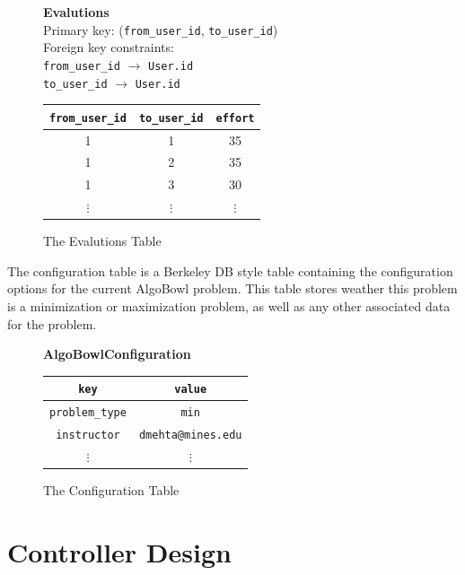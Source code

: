 \documentclass[12pt]{article}
\begin{document}
\begin{figure}
    \centering
    \textbf{Evalutions} \\
    Primary key: (\texttt{from\_user\_id}, \texttt{to\_user\_id}) \\
    Foreign key constraints: \\
    \texttt{from\_user\_id} $\to$ \texttt{User.id} \\
    \texttt{to\_user\_id} $\to$ \texttt{User.id} \\
    \begin{tabular}{| c | c | c |}
        \hline
        \texttt{from\_user\_id} & \texttt{to\_user\_id} & \texttt{effort} \\
        \hline
        1 & 1 & 35 \\
        \hline
        1 & 2 & 35 \\
        \hline
        1 & 3 & 30 \\
        \hline
        $\vdots$ & $\vdots$ & $\vdots$ \\
        \hline
    \end{tabular}
    \caption{The Evalutions Table}
    \label{evaltable}
\end{figure}

The configuration table is a Berkeley DB style table containing the
configuration options for the current AlgoBowl problem. This table stores
weather this problem is a minimization or maximization problem, as well as any
other associated data for the problem.

\begin{figure}
    \centering
    \textbf{AlgoBowlConfiguration} \\
    \begin{tabular}{| c | c |}
        \hline
        \texttt{key} & \texttt{value} \\
        \hline
        \texttt{problem\_type} & \texttt{min} \\
        \hline
        \texttt{instructor} & \texttt{dmehta@mines.edu} \\
        \hline
        $\vdots$ & $\vdots$ \\
        \hline
    \end{tabular}
    \caption{The Configuration Table}
    \label{conftable}
\end{figure}

\clearpage

\section{Controller Design}
\end{document}
